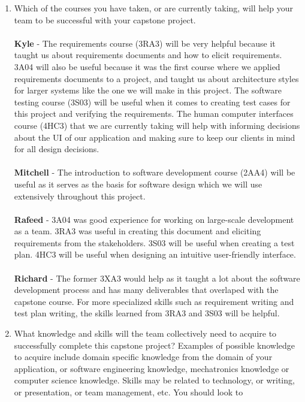 \documentclass[12pt]{article}
\begin{document}
\begin{enumerate}
  \item Which of the courses you have taken, or are currently taking,
    will help your team to be successful with your capstone project. \\
    \\
    \textbf{Kyle} - The requirements course (3RA3) will be very
    helpful because it taught us about requirements documents and how
    to elicit requirements. 3A04 will also be useful because it was
    the first course where we applied requirements documents to a
    project, and taught us about architecture styles for larger
    systems like the one we will make in this project. The software
    testing course (3S03) will be useful when it comes to creating
    test cases for this project and verifying the requirements. The
    human computer interfaces course (4HC3) that we are currently
    taking will help with informing decisions about the UI of our
    application and making sure to keep our clients in mind for all
    design decisions.\\
    \\
    \textbf{Mitchell} - The introduction to software development
    course (2AA4) will be useful as it serves as the basis for
    software design which we will use extensively throughout this project.\\
    \\
    \textbf{Rafeed} - 3A04 was good experience for working on
    large-scale development as a team. 3RA3 was useful in creating
    this document and eliciting requirements from the stakeholders.
    3S03 will be useful when creating a test plan. 4HC3 will be
    useful when designing an intuitive user-friendly interface. \\
    \\
    \textbf{Richard} - The former 3XA3 would help as it taught a lot about the
    software development process and has many deliverables that overlaped with
    the capstone course. For more specialized skills such as requirement writing
    and test plan writing, the skills learned from 3RA3 and 3S03 will be
    helpful.
  \item What knowledge and skills will the team collectively need to
    acquire to successfully complete this capstone project?  Examples
    of possible knowledge to acquire include domain specific
    knowledge from the domain of your application, or software
    engineering knowledge, mechatronics knowledge or computer science
    knowledge.  Skills may be related to technology, or writing, or
    presentation, or team management, etc.  You should look to

\end{enumerate}
\end{document}
